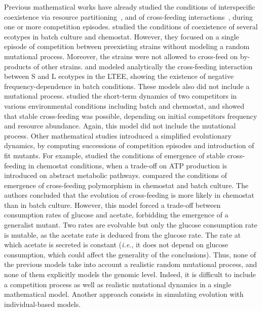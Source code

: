 Previous mathematical works have already studied the conditions of interspecific coexistence via resource partitioning~\citep{stewart-and-levin-1973}, and of cross-feeding interactions~\citep{doebeli-2002,pfeiffer-bonhoeffer-2004,gudelj-et-al-2016}, during one or more competition episodes. \cite{stewart-and-levin-1973} studied the conditions of coexistence of several ecotypes in batch culture and chemostat. However, they focused on a single episode of competition between preexisting strains without modeling a random mutational process. Moreover, the strains were not allowed to cross-feed on by-products of other strains.
\cite{rozen-et-al-2009} and \cite{ribeck-lenski-2015} modeled analytically the cross-feeding interaction between S and L ecotypes in the LTEE, showing the existence of negative frequency-dependence in batch conditions. These models also did not include a mutational process. \cite{gudelj-et-al-2016} studied the short-term dynamics of two competitors in various environmental conditions including batch and chemostat, and showed that stable cross-feeding was possible, depending on initial competitors frequency and resource abundance. Again, this model did not include the mutational process. Other mathematical studies introduced a simplified evolutionary dynamics, by computing successions of competition episodes and introduction of fit mutants. For example, \cite{pfeiffer-bonhoeffer-2004} studied the conditions of emergence of stable cross-feeding in chemostat conditions, when a trade-off on ATP production is introduced on abstract metabolic pathways.
\cite{doebeli-2002} compared the conditions of emergence of cross-feeding polymorphism in chemostat and batch culture. The authors concluded that the evolution of cross-feeding is more likely in chemostat than in batch culture.
However, this model forced a trade-off between consumption rates of glucose and acetate, forbidding the emergence of a generalist mutant. Two rates are evolvable but only the glucose consumption rate is mutable, as the acetate rate is deduced from the glucose rate. The rate at which acetate is secreted is constant (\textit{i.e.}, it does not depend on glucose consumption, which could affect the generality of the conclusions).
Thus, none of the previous models take into account a realistic random mutational process, and none of them explicitly models the genomic level. Indeed, it is difficult to include a competition process as well as realistic mutational dynamics in a single mathematical model. Another approach consists in simulating evolution with individual-based models.

